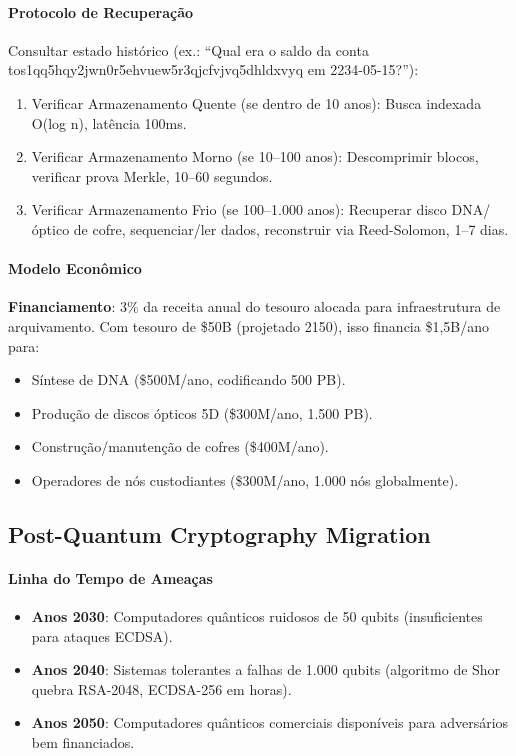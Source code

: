 \documentclass[11pt]{article}
\begin{document}
\paragraph{Protocolo de Recuperação}
Consultar estado histórico (ex.: ``Qual era o saldo da conta tos1qq5hqy2jwn0r5ehvuew5r3qjcfvjvq5dhldxvyq em 2234-05-15?''):
\begin{enumerate}[noitemsep]
  \item Verificar Armazenamento Quente (se dentro de 10 anos): Busca indexada O(log n), latência 100ms.
  \item Verificar Armazenamento Morno (se 10--100 anos): Descomprimir blocos, verificar prova Merkle, 10--60 segundos.
  \item Verificar Armazenamento Frio (se 100--1.000 anos): Recuperar disco DNA/óptico de cofre, sequenciar/ler dados, reconstruir via Reed-Solomon, 1--7 dias.
\end{enumerate}

\paragraph{Modelo Econômico}
\textbf{Financiamento}: 3\% da receita anual do tesouro alocada para infraestrutura de arquivamento. Com tesouro de \$50B (projetado 2150), isso financia \$1,5B/ano para:
\begin{itemize}[noitemsep]
  \item Síntese de DNA (\$500M/ano, codificando 500 PB).
  \item Produção de discos ópticos 5D (\$300M/ano, 1.500 PB).
  \item Construção/manutenção de cofres (\$400M/ano).
  \item Operadores de nós custodiantes (\$300M/ano, 1.000 nós globalmente).
\end{itemize}

\subsection{Post-Quantum Cryptography Migration}

\paragraph{Linha do Tempo de Ameaças}
\begin{itemize}[noitemsep]
  \item \textbf{Anos 2030}: Computadores quânticos ruidosos de 50 qubits (insuficientes para ataques ECDSA).
  \item \textbf{Anos 2040}: Sistemas tolerantes a falhas de 1.000 qubits (algoritmo de Shor quebra RSA-2048, ECDSA-256 em horas).
  \item \textbf{Anos 2050}: Computadores quânticos comerciais disponíveis para adversários bem financiados.
\end{itemize}
\end{document}
